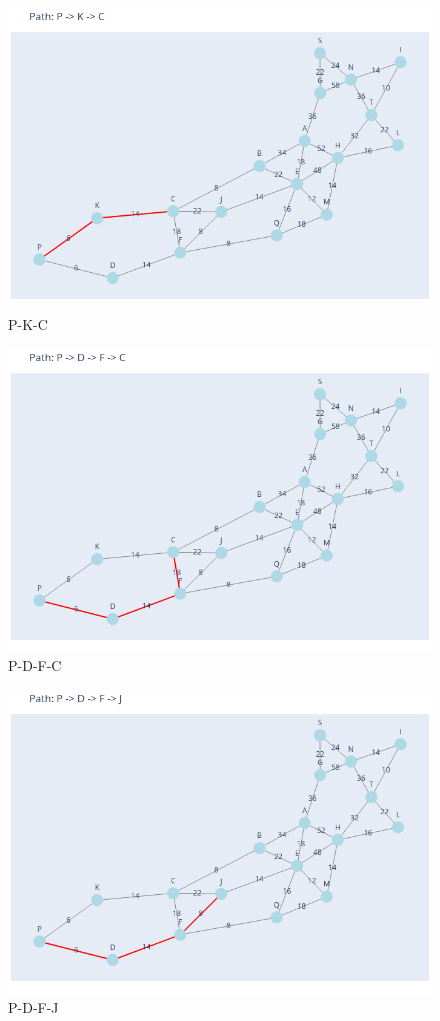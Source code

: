 \documentclass[11pt]{book}
\renewcommand{\=}[1]{\stackrel{#1}{=}} %
\theoremstyle{definition}
\theoremstyle{remark}
\begin{document}
\begin{figure}
    \centering
    \includegraphics[width=0.7\linewidth]{Plots/P_K_C.png}
    \caption{P-K-C}
    \label{fig:enter-label}
\end{figure}
\begin{figure}
    \centering
    \includegraphics[width=0.7\linewidth]{Plots/P_D_F_C.png}
    \caption{P-D-F-C}
    \label{fig:enter-label}
\end{figure}
\begin{figure}
    \centering
    \includegraphics[width=0.7\linewidth]{Plots/P_D_F_J.png}
    \caption{P-D-F-J}
    \label{fig:enter-label}
\end{figure}
\end{document}
